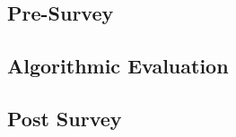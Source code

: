 
\subsection{Pre-Survey}
\label{sec:pre-survey}

\subsection{Algorithmic Evaluation}
\label{sec:algor-eval}

\subsection{Post Survey}
\label{sec:post-survey}


